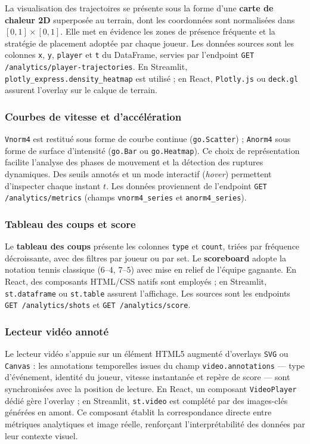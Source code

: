 La visualisation des trajectoires se présente sous la forme d'une \textbf{carte de
chaleur 2D} superposée au terrain, dont les coordonnées sont normalisées dans
$[0,1] \times [0,1]$. Elle met en évidence les zones de présence fréquente et la
stratégie de placement adoptée par chaque joueur. Les données sources sont les
colonnes \texttt{x}, \texttt{y}, \texttt{player} et \texttt{t} du DataFrame, servies
par l'endpoint \texttt{GET /analytics/player-trajectories}. En Streamlit,
\texttt{plotly\_express.density\_heatmap} est utilisé ; en React, \texttt{Plotly.js}
ou \texttt{deck.gl} assurent l'overlay sur le calque de terrain.

\subsubsection{Courbes de vitesse et d'accélération}

\texttt{Vnorm4} est restitué sous forme de courbe continue (\texttt{go.Scatter}) ;
\texttt{Anorm4} sous forme de surface d'intensité (\texttt{go.Bar} ou
\texttt{go.Heatmap}). Ce choix de représentation facilite l'analyse des phases de
mouvement et la détection des ruptures dynamiques. Des seuils annotés et un mode
interactif (\textit{hover}) permettent d'inspecter chaque instant $t$. Les données
proviennent de l'endpoint \texttt{GET /analytics/metrics} (champs
\texttt{vnorm4\_series} et \texttt{anorm4\_series}).

\subsubsection{Tableau des coups et score}

Le \textbf{tableau des coups} présente les colonnes \texttt{type} et \texttt{count},
triées par fréquence décroissante, avec des filtres par joueur ou par set. Le
\textbf{scoreboard} adopte la notation tennis classique ($6$--$4$, $7$--$5$) avec
mise en relief de l'équipe gagnante. En React, des composants HTML/CSS natifs sont
employés ; en Streamlit, \texttt{st.dataframe} ou \texttt{st.table} assurent
l'affichage. Les sources sont les endpoints \texttt{GET /analytics/shots} et
\texttt{GET /analytics/score}.

\subsubsection{Lecteur vidéo annoté}

Le lecteur vidéo s'appuie sur un élément HTML5 augmenté d'overlays \texttt{SVG} ou
\texttt{Canvas} : les annotations temporelles issues du champ
\texttt{video.annotations} --- type d'événement, identité du joueur, vitesse
instantanée et repère de score --- sont synchronisées avec la position de lecture.
En React, un composant \texttt{VideoPlayer} dédié gère l'overlay ; en Streamlit,
\texttt{st.video} est complété par des images-clés générées en amont. Ce composant
établit la correspondance directe entre métriques analytiques et image réelle,
renforçant l'interprétabilité des données par leur contexte visuel.

